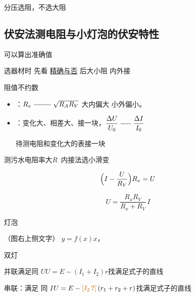 分压选阻，不选大阻

\subsection{伏安法测电阻与小灯泡的伏安特性}
可以算出准确值 %

选器材时 先看 \underline{精确与否} 后大小阻 内外接 %

阻值不约数 %

\begin{itemize}
\item {}：$R_x\ \rule[0.5ex]{2.5em}{0.4pt}\ \sqrt{R_AR_V}$ \quad 大内偏大 \quad 小外偏小。
\item {}：变化大、相差大、接一块，$\dfrac{\Delta U}{U_0}\ \rule[0.5ex]{1.5em}{0.4pt}\ \dfrac{\Delta I}{I_0}$

待测电阻和变化大的表接一块
\end{itemize}

测污水电阻率\quad 大$R$\ 内接法\quad 选小滑变


\[
\Bigl(I-\frac{U}{R_V}\Bigr)R_x=U
\]

\[
U=\frac{R_xR_V}{R_x+R_V}\,I
\]

\quad{}

灯泡


（图右上侧文字） $y=f(x)x$，

双灯

并联\quad 满足同 $U$\quad $U=E-(I_1+I_2)r$\quad 找满足式子的直线

串联\quad ：满足 同 $I$\quad $U=E-\unclear{I_2}\,(r_1+r_2+r)$\quad 找满足式子的直线

